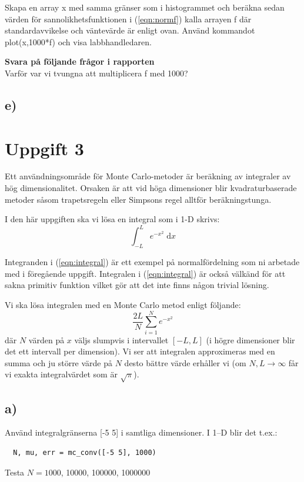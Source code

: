 \documentclass[a4paper]{article}
\begin{document}
Skapa en array x med samma gränser som i histogrammet och beräkna sedan värden 
för sannolikhetsfunktionen i (\ref{eqn:normf}) kalla arrayen f där standardavvikelse 
och väntevärde är enligt ovan. 
Använd kommandot plot(x,1000*f) och visa labbhandledaren.


\textbf{Svara på följande frågor i rapporten}\\
Varför var vi tvungna att multiplicera f med 1000?

\subsection{e)}

\section{Uppgift 3}
Ett användningsområde för Monte Carlo-metoder är beräkning av integraler av hög dimensionalitet. 
Orsaken är att vid höga dimensioner blir kvadraturbaserade metoder såsom trapetsregeln eller 
Simpsons regel alltför beräkningstunga.

I den här uppgiften ska vi lösa en integral som i 1-D skrivs:
\begin{equation} \label{eqn:integral}
    \int_{-L}^{L}e^{-x^2}\; \mathrm{d}x
\end{equation}

Integranden i (\ref{eqn:integral}) är ett exempel på normalfördelning som ni arbetade med i föregående uppgift.
Integralen i (\ref{eqn:integral}) är också välkänd för att sakna primitiv funktion vilket gör att det inte
finns någon trivial lösning.

Vi ska lösa integralen med en Monte Carlo metod enligt följande:
\begin{equation} \label{eqn:integral_mc}
\frac{2L}{N}\displaystyle\sum_{i=1}^{N}e^{-x^2}
\end{equation}
där \(N\) värden på \(x\) väljs slumpvis i intervallet \([-L,L]\)
(i högre dimensioner blir det ett intervall per dimension).
Vi ser att integralen approximeras med en summa och ju större värde på
\(N\) desto bättre värde erhåller vi (om \(N,L \rightarrow \infty\) får vi exakta integralvärdet som är \( \sqrt{\pi} \)).

\subsection{a)}
Använd integralgränserna [-5 5] i samtliga dimensioner. I 1--D blir det t.ex.:
\begin{lstlisting}
  N, mu, err = mc_conv([-5 5], 1000)
\end{lstlisting}
Testa \( N=1000 \), 10000, 100000, 1000000
\end{document}
